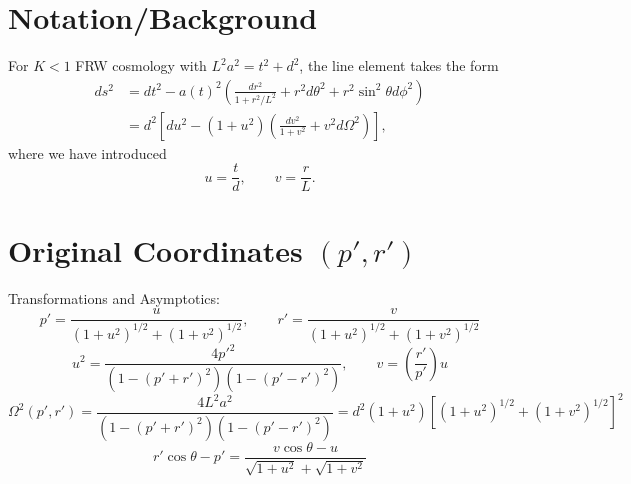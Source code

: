 \documentclass[10pt,letterpaper]{article}
\begin{document}
\section*{Notation/Background}
For $K<1$ FRW cosmology with $L^2 a^2 = t^2+d^2$, the line element takes the form
\begin{align}
ds^2 &=  dt^2 - a(t)^2 \left(  \frac{dr^2}{1+r^2/L^2} + r^2 d\theta^2 + r^2\sin^2\theta d\phi^2 \right)\nonumber\\
&= d^2 \left[ du^2 - (1+u^2)\left( \frac{dv^2}{1+v^2} + v^2 d\Omega^2\right)\right] ,
\end{align}
where we have introduced
\begin{equation}
u = \frac{t}{d},\qquad v = \frac{r}{L}.
\end{equation}
\section*{Original Coordinates $(p',r')$}
Transformations and Asymptotics:
\begin{equation}
p' = \frac{u}{(1+u^2)^{1/2}+(1+v^2)^{1/2}},\qquad r' = \frac{v}{(1+u^2)^{1/2}+(1+v^2)^{1/2}}
\end{equation}
\begin{equation}
u^2 = \frac{4 p'^2}{(1-(p'+r')^2)(1-(p'-r')^2)},\qquad v =\left(\frac{r'}{p'}\right)u
\end{equation}
\begin{equation}
\Omega^2(p',r') = \frac{4 L^2 a^2}{(1-(p'+r')^2)(1-(p'-r')^2)} = d^2(1+u^2)\left[ (1+u^2)^{1/2}+(1+v^2)^{1/2}\right]^2
\end{equation}
\begin{equation}
r'\cos\theta-p' = \frac{v\cos\theta -u}{\sqrt{1+u^2}+\sqrt{1+v^2}}
\end{equation}
\end{document}

